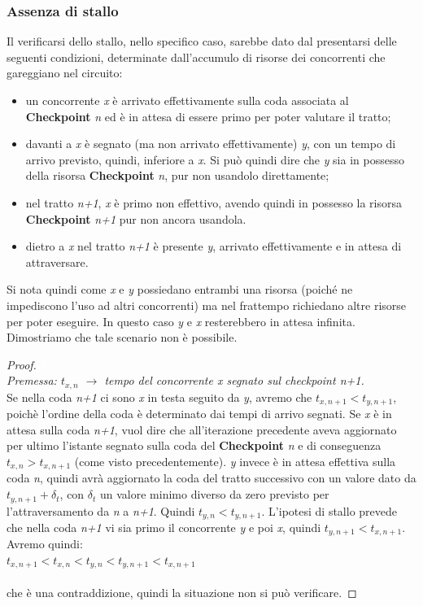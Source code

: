 \subsubsection{Assenza di stallo}
Il verificarsi dello stallo, nello specifico caso, sarebbe dato dal presentarsi
delle seguenti condizioni, determinate dall'accumulo di risorse dei concorrenti che gareggiano nel circuito:
\begin{itemize}
\item un concorrente \emph{x} è arrivato effettivamente sulla coda associata al \textbf{Checkpoint} \emph{n} ed
è in attesa di essere primo per poter valutare il tratto;
\item davanti a \emph{x} è segnato (ma non arrivato effettivamente) \emph{y}, con un tempo di arrivo previsto, quindi, inferiore a \emph{x}. 
Si può quindi dire che \emph{y} sia in possesso della risorsa \textbf{Checkpoint} \emph{n}, pur non usandolo direttamente;
\item nel tratto \emph{n+1}, \emph{x} è primo non effettivo, avendo quindi in possesso la risorsa \textbf{Checkpoint} \emph{n+1} pur
non ancora usandola.
\item dietro a \emph{x} nel tratto \emph{n+1} è presente \emph{y}, arrivato effettivamente e in attesa di attraversare.
\end{itemize}
Si nota quindi come \emph{x} e \emph{y} possiedano entrambi una risorsa (poiché ne impediscono l'uso ad altri concorrenti)
ma nel frattempo richiedano altre risorse per poter eseguire. In questo caso \emph{y} e \emph{x} resterebbero in attesa infinita.
Dimostriamo che tale scenario non è possibile.
\begin{proof}
\textcolor{white}{42}\\
\emph{Premessa: $t_{x,n}$ $\rightarrow$ tempo del concorrente \emph{x} segnato sul
checkpoint \emph{n+1}.}\\
	Se nella coda \emph{n+1} ci sono \emph{x} in testa seguito da \emph{y}, avremo che
$t_{x,n+1}<t_{y,n+1}$, poich\`{e} l'ordine della coda \`{e} 
	determinato dai tempi di arrivo segnati.
	Se \emph{x} \`{e} in attesa sulla coda \emph{n+1}, vuol dire che all'iterazione precedente aveva aggiornato per
ultimo l'istante segnato sulla coda del \textbf{Checkpoint} \emph{n} e di conseguenza $t_{x,n}>t_{x,n+1}$ (come visto precedentemente).
	\emph{y} invece \`{e} in attesa effettiva sulla coda \emph{n}, quindi avr\`{a}
aggiornato la coda del tratto successivo con un valore dato da $t_{y,n+1} + \delta_t$, 
	con $ \delta_t$ un valore minimo diverso da zero previsto per
l'attraversamento da \emph{n} a \emph{n+1}. Quindi $t_{y,n}<t_{y,n+1}$.
	L'ipotesi di stallo prevede che nella coda \emph{n+1} vi sia primo il concorrente \emph{y} e poi \emph{x},
quindi $t_{y,n+1}<t_{x,n+1}$.
	Avremo quindi:\\
	$t_{x,n+1}<t_{x,n}<t_{y,n}<t_{y,n+1}<t_{x,n+1}$\\\\
	che \`{e} una contraddizione, quindi la situazione non si pu\`{o}
verificare.
\end{proof}
